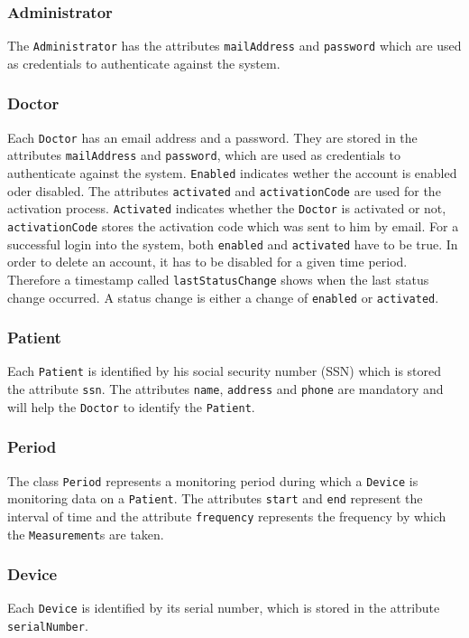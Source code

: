 \documentclass[fontsize=12pt,
               paper=a4,
               twoside=false,
               parskip=half,
               ]{scrartcl}
\begin{document}
\subsubsection{Administrator} 

The \texttt{Administrator} has the attributes \texttt{mailAddress} and \texttt{password} which are used as credentials to authenticate against the system. 

\subsubsection{Doctor}
Each \texttt{Doctor} has an email address and a password. They are stored in the attributes \texttt{mailAddress} and \texttt{password}, which are used as credentials to authenticate against the system. \texttt{Enabled} indicates wether the account is enabled oder disabled. The attributes \texttt{activated} and \texttt{activationCode} are used for the activation process. \texttt{Activated} indicates whether the \texttt{Doctor} is activated or not, \texttt{activationCode} stores the activation code which was sent to him by email. For a successful login into the system, both \texttt{enabled} and \texttt{activated} have to be true. In order to delete an account, it has to be disabled for a given time period. Therefore a timestamp called \texttt{lastStatusChange} shows when the last status change occurred. A status change is either a change of \texttt{enabled} or \texttt{activated}.

\subsubsection{Patient}
Each \texttt{Patient} is identified by his social security number (SSN) which is stored the attribute \texttt{ssn}. The attributes \texttt{name}, \texttt{address} and \texttt{phone} are mandatory and will help the \texttt{Doctor} to identify the \texttt{Patient}. 

\subsubsection{Period}
The class \texttt{Period} represents a monitoring period during which a \texttt{Device} is monitoring data on a \texttt{Patient}. The attributes \texttt{start} and \texttt{end} represent the interval of time and the attribute \texttt{frequency} represents the frequency by which the \texttt{Measurement}s are taken.

\subsubsection{Device}
Each \texttt{Device} is identified by its serial number, which is stored in the attribute \texttt{serialNumber}.
\end{document}
